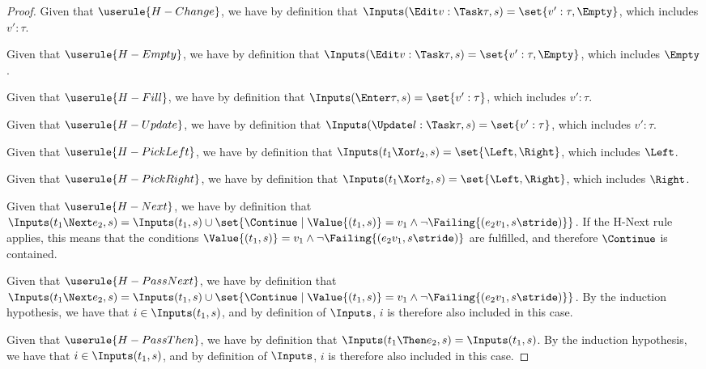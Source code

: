 \begin{proof}

       {Given that $\userule{H-Change}$, we have by definition that $\Inputs(\Edit v:\Task\tau,s) = \set{v':\tau,\Empty}$, which includes $v':\tau$.}

       {Given that $\userule{H-Empty}$, we have by definition that $\Inputs(\Edit v:\Task\tau,s) = \set{v':\tau,\Empty}$, which includes $\Empty$.}

       {Given that $\userule{H-Fill}$, we have by definition that $\Inputs(\Enter \tau,s) = \set{v':\tau }$, which includes $v':\tau$.}

       {Given that $\userule{H-Update}$, we have by definition that $\Inputs(\Update l:\Task\tau,s)= \set{v':\tau }$, which includes $v':\tau$.}

       {Given that $\userule{H-PickLeft}$, we have by definition that $\Inputs(t_1\Xor t_2,s) = \set{ \Left,\Right}$, which includes $\Left$.}

       {Given that $\userule{H-PickRight}$, we have by definition that $\Inputs(t_1\Xor t_2,s) = \set{ \Left,\Right}$, which includes $\Right$.}

       {Given that $\userule{H-Next}$, we have by definition that $\Inputs(t_1\Next e_2,s) = \Inputs(t_1,s) \cup \set{\Continue\mid \Value{(t_1,s)} = v_1 \wedge \neg\Failing{(e_2 v_1,s\stride)}}$.
       If the H-Next rule applies, this means that the conditions $\Value{(t_1,s)} = v_1 \wedge \neg\Failing{(e_2 v_1,s\stride)}$ are fulfilled, and therefore $\Continue$ is contained.}

       {Given that $\userule{H-PassNext}$, we have by definition that $\Inputs(t_1\Next e_2,s) = \Inputs(t_1,s) \cup \set{\Continue\mid \Value{(t_1,s)} = v_1 \wedge \neg\Failing{(e_2 v_1,s\stride)}}$.
       By the induction hypothesis, we have that $i\in \Inputs(t_1,s)$, and by definition of $\Inputs$, $i$ is therefore also included in this case.}

       {Given that $\userule{H-PassThen}$, we have by definition that $\Inputs(t_1\Then e_2,s)= \Inputs(t_1,s)$.
       By the induction hypothesis, we have that $i\in \Inputs(t_1,s)$, and by definition of $\Inputs$, $i$ is therefore also included in this case.}


\end{proof}
